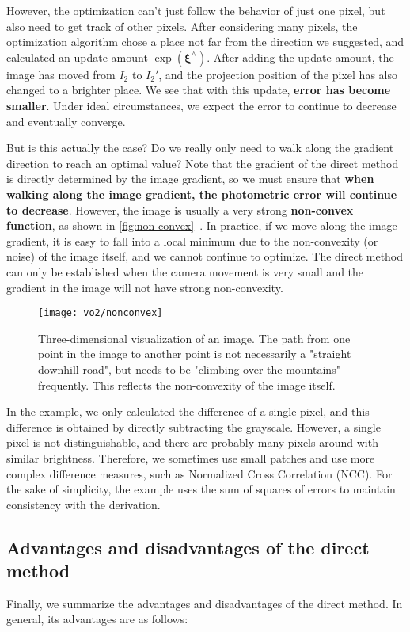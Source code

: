{However, the optimization can't just follow the behavior of just one pixel, but also need to get track of other pixels. After considering many pixels, the optimization algorithm chose a place not far from the direction we suggested, and calculated an update amount $\exp ({\bm{\xi}^\wedge} )$. After adding the update amount, the image has moved from $I_2$ to $I_2'$, and the projection position of the pixel has also changed to a brighter place. We see that with this update, \textbf{error has become smaller}. Under ideal circumstances, we expect the error to continue to decrease and eventually converge.

But is this actually the case? Do we really only need to walk along the gradient direction to reach an optimal value? Note that the gradient of the direct method is directly determined by the image gradient, so we must ensure that \textbf{when walking along the image gradient, the photometric error will continue to decrease}. However, the image is usually a very strong \textbf{non-convex function}, as shown in \autoref{fig:non-convex}~. In practice, if we move along the image gradient, it is easy to fall into a local minimum due to the non-convexity (or noise) of the image itself, and we cannot continue to optimize. The direct method can only be established when the camera movement is very small and the gradient in the image will not have strong non-convexity.

\begin{figure}[!htp]
	\centering
	\texttt{[image: vo2/nonconvex]}
	\caption{Three-dimensional visualization of an image. The path from one point in the image to another point is not necessarily a "straight downhill road", but needs to be "climbing over the mountains" frequently. This reflects the non-convexity of the image itself.}
	\label{fig:non-convex}
\end{figure}

In the example, we only calculated the difference of a single pixel, and this difference is obtained by directly subtracting the grayscale. However, a single pixel is not distinguishable, and there are probably many pixels around with similar brightness. Therefore, we sometimes use small patches and use more complex difference measures, such as Normalized Cross Correlation (NCC). For the sake of simplicity, the example uses the sum of squares of errors to maintain consistency with the derivation.

\subsection{Advantages and disadvantages of the direct method}
Finally, we summarize the advantages and disadvantages of the direct method. In general, its advantages are as follows:

}
